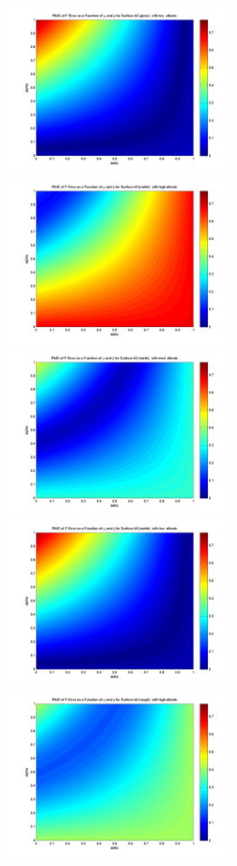 \begin{description}
\begin{figure}[!ht]
\begin{minipage}[t]{200mm}
    \includegraphics[width=65mm]{figs/sda/F_error_albedo__low_surf__gloss.jpg}
    \includegraphics[width=65mm]{figs/sda/F_error_albedo_high_surf__matte.jpg}
    \includegraphics[width=65mm]{figs/sda/F_error_albedo__med_surf__matte.jpg}
    \includegraphics[width=65mm]{figs/sda/F_error_albedo__low_surf__matte.jpg}
    \includegraphics[width=65mm]{figs/sda/F_error_albedo_high_surf__rough.jpg}

\end{minipage}
\end{figure}
\end{description}
